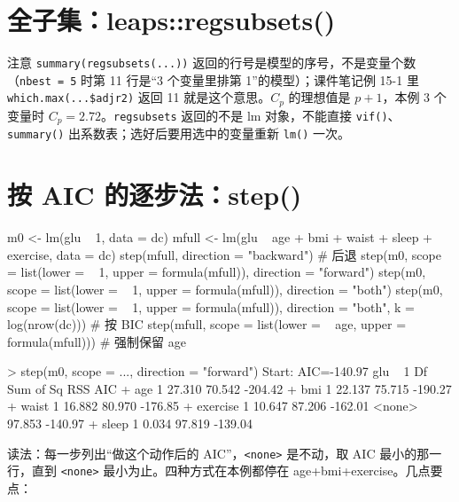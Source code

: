 \section{全子集：leaps::regsubsets()}
注意 \Verb|summary(regsubsets(...))| 返回的行号是模型的序号，不是变量个数（\Verb|nbest = 5| 时第 11 行是“3 个变量里排第 1”的模型）；课件笔记例 15-1 里 \Verb|which.max(...$adjr2)| 返回 11 就是这个意思。$C_p$ 的理想值是 $p+1$，本例 3 个变量时 $C_p=2.72$。\Verb|regsubsets| 返回的不是 lm 对象，不能直接 \Verb|vif()|、\Verb|summary()| 出系数表；选好后要用选中的变量重新 \Verb|lm()| 一次。

\section{按 AIC 的逐步法：step()}
\begin{rcode}
m0    <- lm(glu ~ 1, data = dc)
mfull <- lm(glu ~ age + bmi + waist + sleep + exercise, data = dc)
step(mfull, direction = "backward")                                  # 后退
step(m0, scope = list(lower = ~ 1, upper = formula(mfull)), direction = "forward")
step(m0, scope = list(lower = ~ 1, upper = formula(mfull)), direction = "both")
step(m0, scope = list(lower = ~ 1, upper = formula(mfull)), direction = "both",
     k = log(nrow(dc)))                                              # 按 BIC
step(mfull, scope = list(lower = ~ age, upper = formula(mfull)))     # 强制保留 age
\end{rcode}
\begin{routput}
> step(m0, scope = ..., direction = "forward")
Start:  AIC=-140.97
glu ~ 1
           Df Sum of Sq    RSS     AIC
+ age       1    27.310 70.542 -204.42
+ bmi       1    22.137 75.715 -190.27
+ waist     1    16.882 80.970 -176.85
+ exercise  1    10.647 87.206 -162.01
<none>                  97.853 -140.97
+ sleep     1     0.034 97.819 -139.04
\end{routput}
读法：每一步列出“做这个动作后的 AIC”，\Verb|<none>| 是不动，取 AIC 最小的那一行，直到 \Verb|<none>| 最小为止。四种方式在本例都停在 age+bmi+exercise。几点要点：

